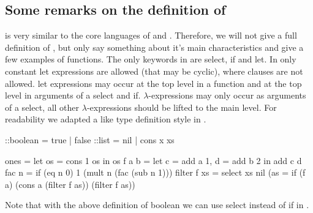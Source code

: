 \subsection{Some remarks on the definition of \Sapl}
\Sapl is very similar to the core languages of \Haskell and \Clean. 
Therefore, we will not give a full definition of \Sapl, but only say something about it's main characteristics
and give a few examples of \Sapl functions.
The only keywords in \Sapl are \textsf{select}, \textsf{if} and \textsf{let}.
In \Sapl only constant \textsf{let} expressions are allowed (that may be cyclic), \textsf{where} clauses are not allowed.
\textsf{let} expressions may occur at the top level in a function and at the top level in  arguments of a  \textsf{select} and \textsf{if}.
$\lambda$-expressions may only occur as arguments of a \textsf{select}, all other $\lambda$-expressions should be lifted to the main
level. 
For readability we adapted a \Clean like type definition style in \Sapl. 
\begin{CleanCode}
::boolean = true | false
::list = nil | cons x xs

ones = let os = cons 1 os in os 
f a b = let c = add a 1, d = add b 2 in add c d
fac n = if (eq n 0) 1 (mult n (fac (sub n 1)))
filter f xs = select xs nil (\a as = if (f a) (cons a (filter f as)) (filter f as))
\end{CleanCode}
Note that with the above definition of boolean we can use \textsf{select} instead of \textsf{if} in \Sapl. 




